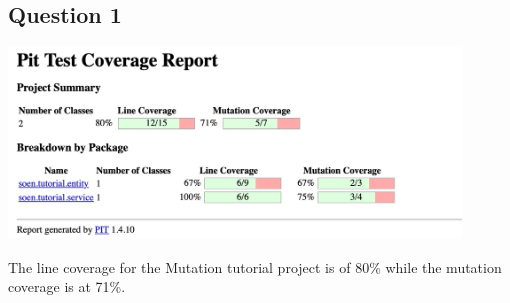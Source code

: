 \newpage
\subsection*{Question 1}

\begin{center}
        \includegraphics[width=0.9\textwidth]{img/partA-coverage.jpg}
\end{center}

\noindent The line coverage for the Mutation tutorial project is of 80\% while the mutation coverage is at 71\%.
